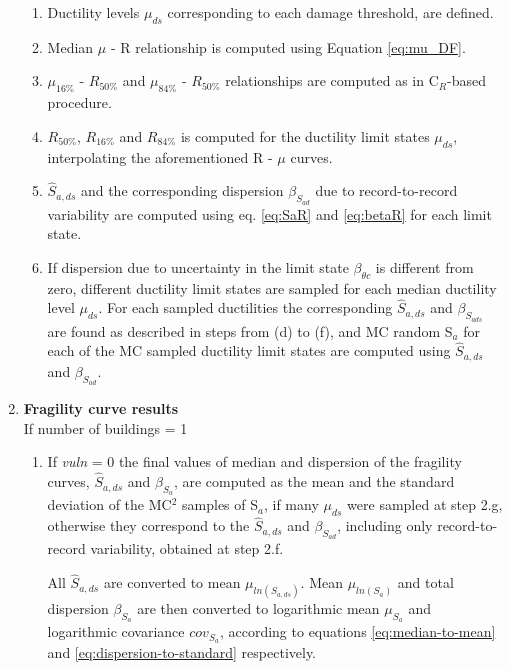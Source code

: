 \begin{enumerate}
\begin{enumerate}
\item Ductility levels $\mu_{ds}$ corresponding to each damage threshold, are defined.

\item Median $\mu$ - R relationship is computed using Equation \ref{eq:mu_DF}.

\item $\mu_{16\%}$ - $R_{50\%}$ and $\mu_{84\%}$ - $R_{50\%}$ relationships are computed as in C$_R$-based procedure.

\item $R_{50\%}$, $R_{16\%}$ and $R_{84\%}$ is computed for the ductility limit states $\mu_{ds}$, interpolating the aforementioned R - $\mu$ curves.

\item $\hat{S}_{a,ds}$ and the corresponding dispersion $\beta_{S_{a d}}$ due to record-to-record variability are computed using eq. \ref{eq:SaR} and \ref{eq:betaR} for each limit state.

\item If dispersion due to uncertainty in the limit state $\beta_{\theta c}$ is different from zero, different ductility limit states are sampled for each median ductility level $\mu_{ds}$. For each sampled ductilities the corresponding $\hat{S}_{a,ds}$ and $\beta_{S_{a ds}}$ are found as described in steps from (d) to (f), and MC random S$_a$ for each of the MC sampled ductility limit states are computed using $\hat{S}_{a,ds}$ and $\beta_{S_{a d}}$.\\

\end{enumerate}

\item \textbf{Fragility curve results}\\
If number of buildings = 1\\
\begin{enumerate}
\item If \textit{vuln} = 0
the final values of median and dispersion of the fragility curves, $\hat{S}_{a,ds}$ and $\beta_{S_a}$, are computed as the mean and the standard deviation of the MC$^2$ samples of S$_a$, if many $\mu_{ds}$ were sampled at step 2.g, otherwise they correspond to the $\hat{S}_{a,ds}$ and $\beta_{S_{a d}}$, including only record-to-record variability, obtained at step 2.f.

All $\hat{S}_{a, ds}$ are converted to mean $\mu_{ln(S_{a, ds})}$. Mean $\mu_{ln(S_{a})}$ and total dispersion $\beta_{S_a}$ are then converted to logarithmic mean $\mu_{S_a}$ and logarithmic covariance $cov_{S_a}$, according to equations \ref{eq:median-to-mean} and \ref{eq:dispersion-to-standard} respectively.


\end{enumerate}
\end{enumerate}
